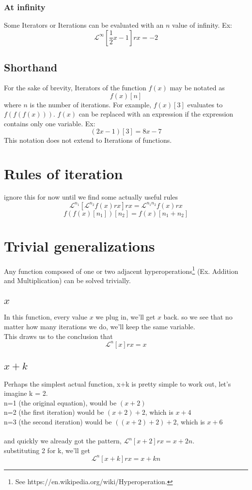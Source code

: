 \documentclass[10pt, letterpaper]{article}
\begin{document}
\subsubsection{At infinity}
Some Iterators or Iterations can be evaluated with an $n$ value of infinity. Ex:
$$\mathscr{L}^\infty [\frac{1}{2}x - 1] rx = -2$$

\subsection{Shorthand}
For the sake of brevity, Iterators of the function $f(x)$ may be notated as
$$f(x)[n]$$ 
where $n$ is the number of iterations. For example, $f(x)[3]$ evaluates to $f(f(f(x)))$. $f(x)$ can be replaced with an expression if the expression contains only one variable. Ex:
$$(2x-1)[3] = 8x-7$$
This notation does not extend to Iterations of functions.

\section{Rules of iteration}
ignore this for now until we find some actually useful rules
$$\mathscr{L}^{n_1}[\mathscr{L}^{n_2} f(x) rx] rx = \mathscr{L}^{n_1n_2} f(x) rx$$
$$f(f(x)[n_1])[n_2] = f(x)[n_1+n_2]$$

\section{Trivial generalizations}
Any function composed of one or two adjacent hyperoperations\footnote{See https://en.wikipedia.org/wiki/Hyperoperation.} (Ex. Addition and Multiplication) can be solved trivially.

\subsection{$x$}
In this function, every value {$x$} we plug in, we'll get {$x$} back. so we see that no matter how many iterations we do, we'll keep the same variable.
\\This draws us to the conclusion that 
$$\mathscr{L}^n [x] rx = x$$

\subsection{$x+k$}
Perhaps the simplest actual function, x+k is pretty simple to work out, let's imagine k = 2.
\\
n=1 (the original equation), would be {$(x+2)$}
\\
n=2 (the first iteration) would be {$(x+2)+2$}, which is {$x+4$}
\\
n=3 (the second iteration) would be {$((x+2)+2)+2$}, which is {$x+6$}
\\
\\
and quickly we already got the pattern, $\mathscr{L}^n [x+2] rx = x+2n$.
\\
substituting 2 for k, we'll get
$$\mathscr{L}^n [x+k] rx = x+kn$$
\end{document}

